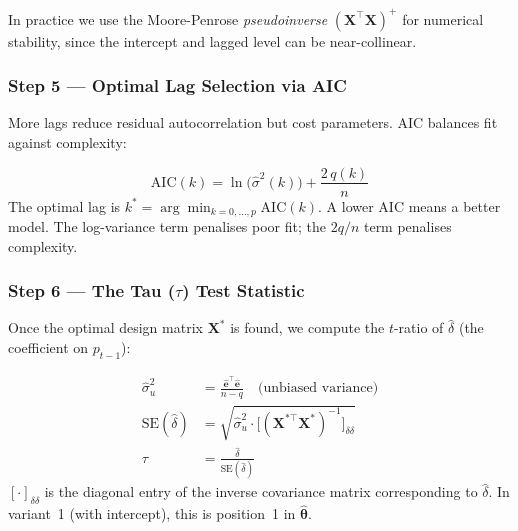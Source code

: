 \documentclass[10pt,a4paper,twocolumn]{article}
\begin{document}
In practice we use the Moore-Penrose \emph{pseudoinverse}
$(\mathbf{X}^\top\mathbf{X})^+$ for numerical stability, since the
intercept and lagged level can be near-collinear.

\subsubsection{Step 5 --- Optimal Lag Selection via AIC}

More lags reduce residual autocorrelation but cost parameters.
AIC balances fit against complexity:

\begin{tcolorbox}[mathbox={Formula 5 --- Akaike Information Criterion}]
\vspace{-4pt}
\begin{equation}\label{eq:aic}
  \mathrm{AIC}(k) = \ln\!\bigl(\hat\sigma^2(k)\bigr)
                  + \frac{2\,q(k)}{n}
\end{equation}
\vspace{-3pt}
The optimal lag is $k^* = \arg\min_{k=0,\ldots,p}\mathrm{AIC}(k)$.
A lower AIC means a better model.  The log-variance term penalises
poor fit; the $2q/n$ term penalises complexity.
\vspace{-2pt}
\end{tcolorbox}

\subsubsection{Step 6 --- The Tau (\texorpdfstring{$\tau$}{tau}) Test Statistic}

Once the optimal design matrix $\mathbf{X}^*$ is found, we compute
the $t$-ratio of $\hat\delta$ (the coefficient on $p_{t-1}$):

\begin{tcolorbox}[mathbox={Formula 6 --- Tau Statistic}]
\vspace{-4pt}
\begin{align}
  \hat\sigma^2_u &=
    \frac{\hat{\mathbf{e}}^\top\hat{\mathbf{e}}}{n - q}
    \quad\text{(unbiased variance)}\\
  \mathrm{SE}(\hat\delta) &=
    \sqrt{\hat\sigma^2_u\cdot
    \bigl[(\mathbf{X}^{*\top}\mathbf{X}^*)^{-1}\bigr]_{\delta\delta}}
    \label{eq:se}\\
  \tau &= \frac{\hat\delta}{\mathrm{SE}(\hat\delta)}
    \label{eq:tau}
\end{align}
\vspace{-4pt}
$[\cdot]_{\delta\delta}$ is the diagonal entry of the inverse
covariance matrix corresponding to $\hat\delta$.  In variant~1
(with intercept), this is position~1 in $\hat{\boldsymbol\theta}$.
\vspace{-2pt}
\end{tcolorbox}
\end{document}
